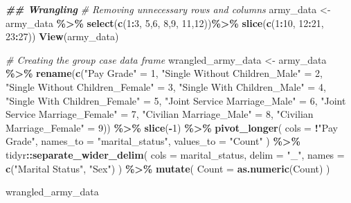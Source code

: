 \documentclass[
]{article}
\newenvironment{Shaded}{\begin{snugshade}}{\end{snugshade}}
\newcommand{\AttributeTok}[1]{\textcolor[rgb]{0.13,0.29,0.53}{#1}}
\newcommand{\CommentTok}[1]{\textcolor[rgb]{0.56,0.35,0.01}{\textit{#1}}}
\newcommand{\DecValTok}[1]{\textcolor[rgb]{0.00,0.00,0.81}{#1}}
\newcommand{\DocumentationTok}[1]{\textcolor[rgb]{0.56,0.35,0.01}{\textbf{\textit{#1}}}}
\newcommand{\FunctionTok}[1]{\textcolor[rgb]{0.13,0.29,0.53}{\textbf{#1}}}
\newcommand{\NormalTok}[1]{#1}
\newcommand{\OtherTok}[1]{\textcolor[rgb]{0.56,0.35,0.01}{#1}}
\newcommand{\SpecialCharTok}[1]{\textcolor[rgb]{0.81,0.36,0.00}{\textbf{#1}}}
\newcommand{\StringTok}[1]{\textcolor[rgb]{0.31,0.60,0.02}{#1}}
\begin{document}
\begin{Shaded}
\begin{Highlighting}[]
\DocumentationTok{\#\# Wrangling}
\CommentTok{\# Removing unnecessary rows and columns}
\NormalTok{army\_data }\OtherTok{\textless{}{-}}\NormalTok{ army\_data }\SpecialCharTok{\%\textgreater{}\%}
  \FunctionTok{select}\NormalTok{(}\FunctionTok{c}\NormalTok{(}\DecValTok{1}\SpecialCharTok{:}\DecValTok{3}\NormalTok{, }\DecValTok{5}\NormalTok{,}\DecValTok{6}\NormalTok{, }\DecValTok{8}\NormalTok{,}\DecValTok{9}\NormalTok{, }\DecValTok{11}\NormalTok{,}\DecValTok{12}\NormalTok{))}\SpecialCharTok{\%\textgreater{}\%}
  \FunctionTok{slice}\NormalTok{(}\FunctionTok{c}\NormalTok{(}\DecValTok{1}\SpecialCharTok{:}\DecValTok{10}\NormalTok{, }\DecValTok{12}\SpecialCharTok{:}\DecValTok{21}\NormalTok{, }\DecValTok{23}\SpecialCharTok{:}\DecValTok{27}\NormalTok{))}
\FunctionTok{View}\NormalTok{(army\_data)}

\CommentTok{\# Creating the group case data frame}
\NormalTok{wrangled\_army\_data }\OtherTok{\textless{}{-}}\NormalTok{ army\_data }\SpecialCharTok{\%\textgreater{}\%}
  \FunctionTok{rename}\NormalTok{(}\FunctionTok{c}\NormalTok{(}\StringTok{"Pay Grade"} \OtherTok{=} \DecValTok{1}\NormalTok{,}
           \StringTok{"Single Without Children\_Male"} \OtherTok{=} \DecValTok{2}\NormalTok{,}
           \StringTok{"Single Without Children\_Female"} \OtherTok{=} \DecValTok{3}\NormalTok{,}
           \StringTok{"Single With Children\_Male"} \OtherTok{=} \DecValTok{4}\NormalTok{,}
           \StringTok{"Single With Children\_Female"} \OtherTok{=} \DecValTok{5}\NormalTok{,}
           \StringTok{"Joint Service Marriage\_Male"} \OtherTok{=} \DecValTok{6}\NormalTok{,}
           \StringTok{"Joint Service Marriage\_Female"} \OtherTok{=} \DecValTok{7}\NormalTok{,}
           \StringTok{"Civilian Marriage\_Male"} \OtherTok{=} \DecValTok{8}\NormalTok{,}
           \StringTok{"Civilian Marriage\_Female"} \OtherTok{=} \DecValTok{9}\NormalTok{)) }\SpecialCharTok{\%\textgreater{}\%}
  \FunctionTok{slice}\NormalTok{(}\SpecialCharTok{{-}}\DecValTok{1}\NormalTok{) }\SpecialCharTok{\%\textgreater{}\%}
  \FunctionTok{pivot\_longer}\NormalTok{(}
    \AttributeTok{cols =} \SpecialCharTok{!}\StringTok{"Pay Grade"}\NormalTok{,}
    \AttributeTok{names\_to =} \StringTok{"marital\_status"}\NormalTok{,}
    \AttributeTok{values\_to =} \StringTok{"Count"}
\NormalTok{  ) }\SpecialCharTok{\%\textgreater{}\%}
\NormalTok{  tidyr}\SpecialCharTok{::}\FunctionTok{separate\_wider\_delim}\NormalTok{(}
    \AttributeTok{cols =}\NormalTok{ marital\_status,}
    \AttributeTok{delim =} \StringTok{"\_"}\NormalTok{,}
    \AttributeTok{names =} \FunctionTok{c}\NormalTok{(}\StringTok{"Marital Status"}\NormalTok{, }\StringTok{"Sex"}\NormalTok{)}
\NormalTok{  ) }\SpecialCharTok{\%\textgreater{}\%}
  \FunctionTok{mutate}\NormalTok{(}
    \AttributeTok{Count =} \FunctionTok{as.numeric}\NormalTok{(Count)}
\NormalTok{  )}

\NormalTok{wrangled\_army\_data}
\end{Highlighting}
\end{Shaded}
\end{document}

